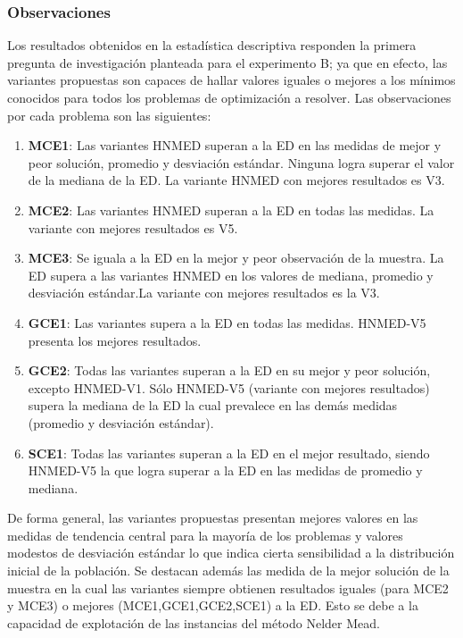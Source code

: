\subsubsection{Observaciones}
Los resultados obtenidos en la estadística descriptiva responden la primera pregunta de investigación planteada para el experimento B; ya que en efecto, las variantes propuestas son capaces de hallar valores iguales o mejores a los mínimos conocidos para todos los problemas de optimización a resolver. Las observaciones por cada problema son las siguientes:
\begin{enumerate}
	\item \textbf{MCE1}: Las variantes HNMED superan a la ED en las medidas de mejor y peor solución, promedio y desviación estándar. Ninguna logra superar el valor de la mediana de la ED. La variante HNMED con mejores resultados es V3.
	\item \textbf{MCE2}: Las variantes HNMED superan a la ED en todas las medidas. La variante con mejores resultados es V5.
	\item \textbf{MCE3}: Se iguala a la ED en la mejor y peor observación de la muestra. La ED supera a las variantes HNMED en los valores de mediana, promedio y desviación estándar.La variante con mejores resultados es la V3.
	\item \textbf{GCE1}: Las variantes supera a la ED en todas las medidas. HNMED-V5 presenta los mejores resultados.
	\item \textbf{GCE2}: Todas las variantes superan a la ED en su mejor y peor solución, excepto HNMED-V1. Sólo HNMED-V5 (variante con mejores resultados) supera la mediana de la ED la cual prevalece en las demás medidas (promedio y desviación estándar).
	\item \textbf{SCE1}: Todas las variantes superan a la ED en el mejor resultado, siendo HNMED-V5 la que logra superar a la ED en las medidas de promedio y mediana. 
\end{enumerate}
De forma general, las variantes propuestas presentan mejores valores en las medidas de tendencia central para la mayoría de los problemas y valores modestos de desviación estándar lo que indica cierta sensibilidad a la distribución inicial de la población. Se destacan además las medida de la mejor solución de la muestra en la cual las variantes siempre obtienen resultados iguales (para MCE2 y MCE3) o mejores (MCE1,GCE1,GCE2,SCE1) a la ED. Esto se debe a la capacidad de explotación de las instancias del método Nelder Mead.

